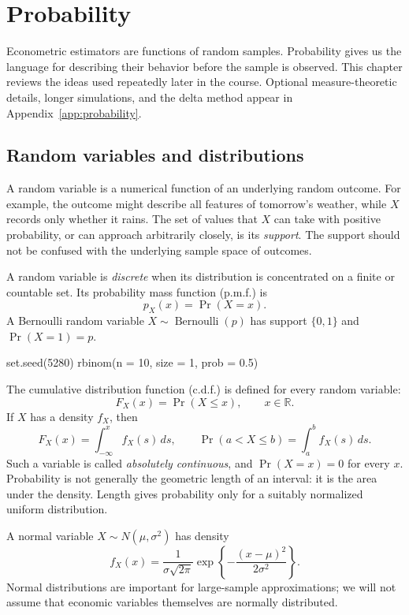 \chapter{Probability}
\label{ch:probability}

Econometric estimators are functions of random samples.  Probability gives
us the language for describing their behavior before the sample is observed.
This chapter reviews the ideas used repeatedly later in the course.  Optional
measure-theoretic details, longer simulations, and the delta method appear in
Appendix~\ref{app:probability}.

\section{Random variables and distributions}

A random variable is a numerical function of an underlying random outcome.
For example, the outcome might describe all features of tomorrow's weather,
while $X$ records only whether it rains.  The set of values that $X$ can take
with positive probability, or can approach arbitrarily closely, is its
\emph{support}.  The support should not be confused with the underlying
sample space of outcomes.

A random variable is \emph{discrete} when its distribution is concentrated
on a finite or countable set.  Its probability mass function (p.m.f.) is
\[
  p_X(x)=\Pr(X=x).
\]
A Bernoulli random variable $X\sim\operatorname{Bernoulli}(p)$ has support
$\{0,1\}$ and $\Pr(X=1)=p$.

\begin{rcode}
set.seed(5280)
rbinom(n = 10, size = 1, prob = 0.5)
\end{rcode}

The cumulative distribution function (c.d.f.) is defined for every random
variable:
\[
  F_X(x)=\Pr(X\leq x),\qquad x\in\mathbb R.
\]
If $X$ has a density $f_X$, then
\[
  F_X(x)=\int_{-\infty}^{x}f_X(s)\,ds,
  \qquad
  \Pr(a<X\leq b)=\int_a^b f_X(s)\,ds.
\]
Such a variable is called \emph{absolutely continuous}, and
$\Pr(X=x)=0$ for every $x$.  Probability is not generally the geometric
length of an interval: it is the area under the density.  Length gives
probability only for a suitably normalized uniform distribution.

A normal variable $X\sim N(\mu,\sigma^2)$ has density
\[
  f_X(x)=\frac{1}{\sigma\sqrt{2\pi}}
  \exp\!\left\{-\frac{(x-\mu)^2}{2\sigma^2}\right\}.
\]
Normal distributions are important for large-sample approximations; we will
not assume that economic variables themselves are normally distributed.

